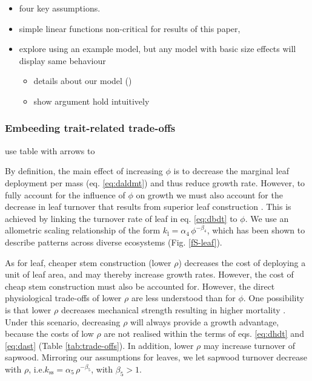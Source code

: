 \documentclass[12pt, a4paper]{article}
\begin{document}
\begin{itemize}
\itemsep1pt\parskip0pt
\item
  four key assumptions.
\item
  simple linear functions non-critical for results of this paper,
\item
  explore using an example model, but any model with basic size effects
  will display same behaviour

  \begin{itemize}
  \itemsep1pt\parskip0pt
  \item
    details about our model ()
  \item
    show argument hold intuitively
  \end{itemize}
\end{itemize}

\subsubsection{Embeeding trait-related trade-offs}

use table with arrows to



By definition, the main effect of increasing $\phi$ is to decrease the
marginal leaf deployment per mass (eq. \ref{eq:daldmt}) and thus reduce
growth rate. However, to fully account for the influence of $\phi$ on
growth we must also account for the decrease in leaf turnover that
results from superior leaf construction \citep{wright-2004}.
This is achieved by linking the turnover rate of leaf in eq.
\ref{eq:dbdt} to $\phi$. We use an allometric scaling relationship of
the form $k_\textrm{l}=\alpha_4 \, \phi^{-\beta_4}$, which has been
shown to describe patterns across diverse
ecosystems \citep{wright-2004} (Fig. \ref{fS-leaf}).

As for leaf, cheaper stem construction (lower $\rho$) decreases the
cost of deploying a unit of leaf area, and may thereby increase growth
rates. However, the cost of cheap stem construction must also be
accounted for. However, the direct physiological trade-offs of lower
$\rho$ are less understood than for $\phi$. One possibility is that
lower $\rho$ decreases mechanical strength resulting in higher
mortality \citep{chave-2009, wright-2010}. Under
this scenario, decreasing $\rho$ will always provide a growth
advantage, because the costs of low $\rho$ are not realised within the
terms of eqs. \ref{eq:dhdt} and \ref{eq:dast} (Table
\ref{tab:trade-offs}). In addition, lower $\rho$ may increase turnover
of sapwood. Mirroring our assumptions for leaves, we let sapwood
turnover decrease with $\rho$,
i.e.$k_\textrm{ss}=\alpha_5 \, \rho^{-\beta_5}$, with $\beta_5 > 1$.
\end{document}

